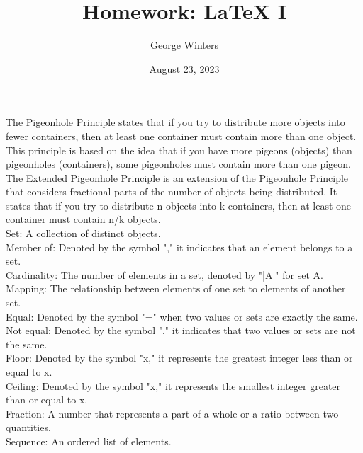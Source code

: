 \documentclass{article}
\title{Homework: LaTeX I}
\author{George Winters}
\date{August 23, 2023}
\begin{document}
\maketitle
\newpage
The Pigeonhole Principle states that if you try to distribute more objects into fewer containers, then at least one container must contain more than one object. This principle is based on the idea that if you have more pigeons (objects) than pigeonholes (containers), some pigeonholes must contain more than one pigeon.
\\[2\baselineskip]The Extended Pigeonhole Principle is an extension of the Pigeonhole Principle that considers fractional parts of the number of objects being distributed. It states that if you try to distribute n objects into k containers, then at least one container must contain n/k objects.
\\[2\baselineskip]Set: A collection of distinct objects.
\\Member of: Denoted by the symbol "," it indicates that an element belongs to a set.
\\Cardinality: The number of elements in a set, denoted by "|A|" for set A.
\\Mapping: The relationship between elements of one set to elements of another set.
\\Equal: Denoted by the symbol "=" when two values or sets are exactly the same.
\\Not equal: Denoted by the symbol "," it indicates that two values or sets are not the same.
\\Floor: Denoted by the symbol "x," it represents the greatest integer less than or equal to x.
\\Ceiling: Denoted by the symbol "x," it represents the smallest integer greater than or equal to x.
\\Fraction: A number that represents a part of a whole or a ratio between two quantities.
\\Sequence: An ordered list of elements.

\newpage
\end{document}
